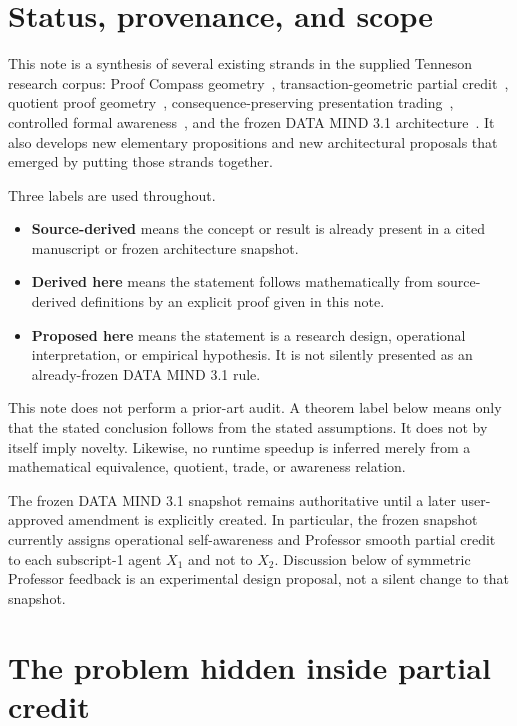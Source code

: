 \documentclass[11pt]{article}
\theoremstyle{definition}
\theoremstyle{remark}
\begin{document}
\tableofcontents
\newpage

\section{Status, provenance, and scope}

This note is a synthesis of several existing strands in the supplied Tenneson research corpus: Proof Compass geometry~\cite{compass}, transaction-geometric partial credit~\cite{partialcredit}, quotient proof geometry~\cite{quotient}, consequence-preserving presentation trading~\cite{trading,tradingdensity}, controlled formal awareness~\cite{awareness}, and the frozen DATA MIND 3.1 architecture~\cite{snapshot}. It also develops new elementary propositions and new architectural proposals that emerged by putting those strands together.

Three labels are used throughout.
\begin{itemize}
\item \textbf{Source-derived} means the concept or result is already present in a cited manuscript or frozen architecture snapshot.
\item \textbf{Derived here} means the statement follows mathematically from source-derived definitions by an explicit proof given in this note.
\item \textbf{Proposed here} means the statement is a research design, operational interpretation, or empirical hypothesis. It is not silently presented as an already-frozen DATA MIND 3.1 rule.
\end{itemize}

This note does not perform a prior-art audit. A theorem label below means only that the stated conclusion follows from the stated assumptions. It does not by itself imply novelty. Likewise, no runtime speedup is inferred merely from a mathematical equivalence, quotient, trade, or awareness relation.

The frozen DATA MIND 3.1 snapshot remains authoritative until a later user-approved amendment is explicitly created. In particular, the frozen snapshot currently assigns operational self-awareness and Professor smooth partial credit to each subscript-1 agent $X_1$ and not to $X_2$. Discussion below of symmetric Professor feedback is an experimental design proposal, not a silent change to that snapshot.

\section{The problem hidden inside partial credit}
\end{document}
